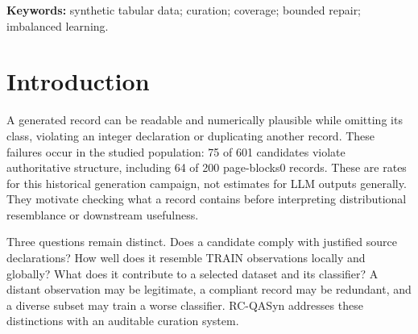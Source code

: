 \begin{abstract}
Among 601 historical synthetic tabular candidate occurrences from three imbalanced classification datasets, 75 (12.5\%) violate source-declared structural requirements; page-blocks0 accounts for 64 violations among 200 candidates (32\%). RC-QASyn makes these defects, statistical support and dataset contribution separately auditable through provenance, schema checks, local and global TRAIN evidence, descriptive admission, fixed-budget construction and bounded integer repair. All 54 eligible repairs become structurally compliant; 21 rejected records remain ineligible. At matched budgets, quality-coverage selection raises distinct-feature TRAIN coverage over source order from 0.622 to 0.948 on Abalone19 and from 0.416 to 0.506 on Ecoli4, with zero exact duplicates. Improved geometry does not ensure improved classification: expanding the repaired page-blocks0 pool lowers logistic pure-synthetic F1 from 0.446 to 0.342 (paired conditional 95\% difference interval: $[-0.135,-0.074]$). A separate train-only offline study uses five fresh stratified splits per dataset. Curated augmentation yields mean F1 $0.758\pm0.166$ on Ecoli4 versus $0.848\pm0.119$ for real-only training; gains on page-blocks0 are small and random curation remains competitive. Saved predictions support 2,000-resample paired intervals. These results establish reproducible structural and geometric effects with mixed utility outcomes, without independently establishing complete semantic validity.
\end{abstract}
\noindent\textbf{Keywords:} synthetic tabular data; curation; coverage; bounded repair; imbalanced learning.

\section{Introduction}
A generated record can be readable and numerically plausible while omitting its class, violating an integer declaration or duplicating another record. These failures occur in the studied population: 75 of 601 candidates violate authoritative structure, including 64 of 200 page-blocks0 records. These are rates for this historical generation campaign, not estimates for LLM outputs generally. They motivate checking what a record contains before interpreting distributional resemblance or downstream usefulness.

Three questions remain distinct. Does a candidate comply with justified source declarations? How well does it resemble TRAIN observations locally and globally? What does it contribute to a selected dataset and its classifier? A distant observation may be legitimate, a compliant record may be redundant, and a diverse subset may train a worse classifier. RC-QASyn addresses these distinctions with an auditable curation system.

